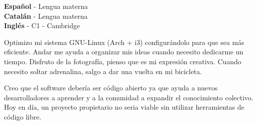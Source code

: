 \documentclass[9pt]{developercv} %
\begin{document}
\begin{minipage}[t]{0.3\textwidth}
	\vspace{-\baselineskip} %

	
	\textbf{Español} - Lengua materna\\
	\textbf{Catalán} - Lengua materna\\
	\textbf{Inglés} -  C1 - Cambridge
\end{minipage}
\hfill
\begin{minipage}[t]{0.3\textwidth}
	\vspace{-\baselineskip} %
	
	
  Optimizo mi sistema GNU-Linux (Arch + i3) configurándolo para que sea más eficiente.
  Andar me ayuda a organizar mis ideas cuando necesito dedicarme un tiempo.
  Disfruto de la fotografía, pienso que es mi expresión creativa.
  Cuando necesito soltar adrenalina, salgo a dar una vuelta en mi bicicleta.
\end{minipage}
\hfill
\begin{minipage}[t]{0.3\textwidth}
	\vspace{-\baselineskip} %
	

	Creo que el software debería ser código abierto ya que ayuda a nuevos desarrolladores a aprender y a la comunidad a expandir el conocimiento colectivo. Hoy en día, un proyecto propietario no seria viable sin utilizar herramientas de código libre.
\end{minipage}

\end{document}
